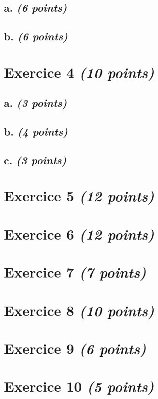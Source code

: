 \documentclass{article}
\begin{document}
\subsection{a. \emph{(6 points)}}

\subsection{b. \emph{(6 points)}}

\clearpage

\section{Exercice 4 \emph{(10 points)}}

\subsection{a. \emph{(3 points)}}

\subsection{b. \emph{(4 points)}}

\subsection{c. \emph{(3 points)}}

\clearpage

\section{Exercice 5 \emph{(12 points)}}

\clearpage

\section{Exercice 6 \emph{(12 points)}}

\clearpage

\section{Exercice 7 \emph{(7 points)}}

\clearpage

\section{Exercice 8 \emph{(10 points)}}

\clearpage

\section{Exercice 9 \emph{(6 points)}}

\clearpage

\section{Exercice 10 \emph{(5 points)}}
\end{document}
